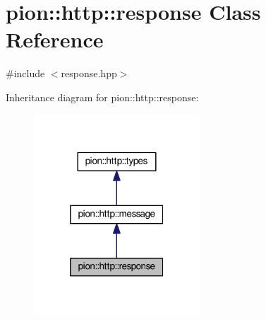 \hypertarget{classpion_1_1http_1_1response}{\section{pion\-:\-:http\-:\-:response Class Reference}
\label{classpion_1_1http_1_1response}
}


{\ttfamily \#include $<$response.\-hpp$>$}



Inheritance diagram for pion\-:\-:http\-:\-:response\-:
\nopagebreak
\begin{figure}[H]
\begin{center}
\leavevmode
\includegraphics[width=176pt]{classpion_1_1http_1_1response__inherit__graph}
\end{center}
\end{figure}


